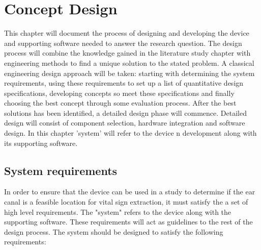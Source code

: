 \chapter{Concept Design}
\label{chp:DEM}
This chapter will document the process of designing and developing the device and supporting software needed to answer the research question. The design process will combine the knowledge gained in the literature study chapter with engineering methods to find a unique solution to the stated problem. A classical engineering design approach will be taken: starting with determining the system requirements, using these requirements to set up a list of quantitative design specifications, developing concepts so meet these specifications and finally choosing the best concept through some evaluation process. After the best solutions has been identified, a detailed design phase will commence. Detailed design will consist of component selection, hardware integration and software design. In this chapter 'system' will refer to the device n development along with its supporting software.

\section{System requirements}
In order to ensure that the device can be used in a study to determine if the ear canal is a feasible location for vital sign extraction, it must satisfy the a set of high level requirements. The "system" refers to the device along with the supporting software. These requirements will act as guidelines to the rest of the design process. The system should be designed to satisfy the following requirements:

